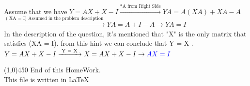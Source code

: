 \documentclass[a4paper,12pt]{article}
\begin{document}
\begin{doublespace}
Assume that we have $Y = AX + X - I \xrightarrow{\text{*A from Right Side}}  YA = A(XA) + XA - A $\\
$  \xrightarrow{\text{( XA = I) Assumed in the problem description }} YA = A + I - A  \rightarrow YA = I $ \\
In the description of the question, it's mentioned that "X" is the only matrix that satisfies (XA = I). from this hint we can conclude that Y = X . \\
$Y = AX + X - I \xrightarrow{\text{ Y =  X }} X = AX + X - I   \rightarrow  \textcolor{blue}{AX = I}  $
\end{doublespace}
\line(1,0){450}
\newpage
End of this HomeWork.\\
This file is written in \LaTeX
\end{document}
